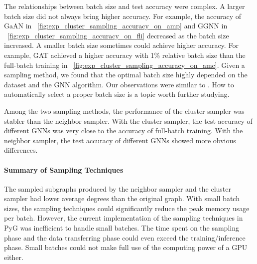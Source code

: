 The relationships between batch size and test accuracy were complex.
%
A larger batch size did not always bring higher accuracy.
%
For example, the accuracy of GaAN in \figurename~\ref{fig:exp_cluster_sampling_accuracy_on_amp} and GGNN in \figurename~\ref{fig:exp_cluster_sampling_accuracy_on_fli} decreased as the batch size increased.
%
A smaller batch size sometimes could achieve higher accuracy.
%
For example, GAT achieved a higher accuracy with 1\% relative batch size than the full-batch training in \figurename~\ref{fig:exp_cluster_sampling_accuracy_on_amc}.
%
Given a sampling method, we found that the optimal batch size highly depended on the dataset and the GNN algorithm.
%
Our observations were similar to \cite{zeng2020_graphsaint}.
%
How to automatically select a proper batch size is a topic worth further studying.

Among the two sampling methods, the performance of the cluster sampler was stabler than the neighbor sampler.
%
With the cluster sampler, the test accuracy of different GNNs was very close to the accuracy of full-batch training.
%
With the neighbor sampler, the test accuracy of different GNNs showed more obvious differences.

\paragraph{Summary of Sampling Techniques}
% 
The sampled subgraphs produced by the neighbor sampler and the cluster sampler had lower average degrees than the original graph.
%
With small batch sizes, the sampling techniques could significantly reduce the peak memory usage per batch.
%
However, the current implementation of the sampling techniques in PyG was inefficient to handle small batches.
%
The time spent on the sampling phase and the data transferring phase could even exceed the training/inference phase.
%
Small batches could not make full use of the computing power of a GPU either.

